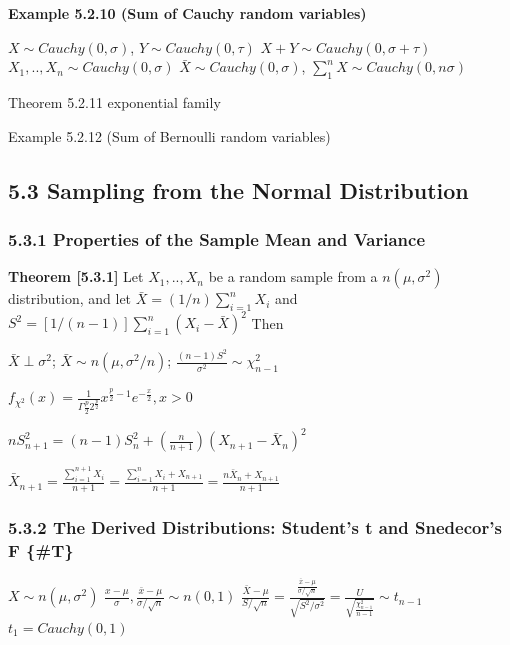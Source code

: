 \documentclass[10pt,twocolumn,portrait]{article}
\begin{document}
\textbf{Example 5.2.10 (Sum of Cauchy random variables)}

\(X\sim Cauchy(0,\sigma)\), \(Y\sim Cauchy(0,\tau)\)
\(X+Y\sim Cauchy(0,\sigma+\tau)\) \(X_1,..,X_n\sim Cauchy(0,\sigma)\)
\(\bar X\sim Cauchy(0,\sigma)\),
\(\sum_{1}^{n} X\sim Cauchy(0,n\sigma)\)

Theorem 5.2.11 exponential family

Example 5.2.12 (Sum of Bernoulli random variables)

\hypertarget{sampling-from-the-normal-distribution}{%
\subsection{5.3 Sampling from the Normal
Distribution}\label{sampling-from-the-normal-distribution}}

\hypertarget{properties-of-the-sample-mean-and-variance}{%
\subsubsection{5.3.1 Properties of the Sample Mean and
Variance}\label{properties-of-the-sample-mean-and-variance}}

\textbf{Theorem {[}5.3.1{]}} Let \(X_1,..,X_n\) be a random sample from
a \(n (\mu,\sigma^2)\) distribution, and let
\(\bar X=(1/n)\sum_{i=1}^nX_i\) and
\(S^2=[1/(n-1)]\sum_{i=1}^n(X_i-\bar X)^2\) Then

\(\bar X\perp\sigma^2\); \(\bar X\sim n(\mu,\sigma^2/n)\);
\(\frac{(n-1)S^2}{\sigma^2}\sim\chi^2_{n-1}\)

\(f_{\chi^2}(x)=\frac{1}{\Gamma \frac{p}2 2^{\frac{p}2}}x^{\frac{p}2-1}e^{-\frac{x}2}, x>0\)

\(nS^2_{n+1}=(n-1)S_n^2+(\frac{n}{n+1})(X_{n+1}-\bar X_n)^2\)

\(\bar X_{n+1}=\frac{\sum_{i=1}^{n+1}X_{i}}{n+1}=\frac{\sum_{i=1}^{n}X_{i}+X_{n+1}}{n+1}=\frac{n\bar X_{n}+X_{n+1}}{n+1}\)

\hypertarget{F}{%
\subsubsection{5.3.2 The Derived Distributions: Student's t and
Snedecor's F \{\#T\}}\label{F}}

\(X\sim n(\mu,\sigma^2)\)
\(\frac{x-\mu}{\sigma},\frac{\bar x-\mu}{\sigma/\sqrt{n}}\sim n(0,1)\)
\(\frac{\bar X-\mu}{S/\sqrt{n}}=\frac{\frac{\bar x-\mu}{\sigma/\sqrt{n}}}{\sqrt{S^2/\sigma^2}}=\frac{U}{\sqrt{\frac{\chi^2_{n-1}}{n-1}}}\sim t_{n-1}\)
\(t_1=Cauchy(0,1)\)
\end{document}
